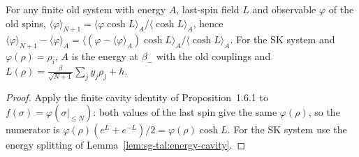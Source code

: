 \begin{lemma}
\label{lem:sg-tal:old-spin-cavity}
  \leanok
{}
For any finite old system with energy $A$, last-spin field $L$ and observable $\varphi$ of the old spins, $\langle\varphi\rangle_{N+1}=\langle\varphi\cosh L\rangle_A/\langle\cosh L\rangle_A$, hence $\langle\varphi\rangle_{N+1}-\langle\varphi\rangle_A=\langle(\varphi-\langle\varphi\rangle_A)\cosh L\rangle_A/\langle\cosh L\rangle_A$.  For the SK system and $\varphi(\rho)=\rho_i$, $A$ is the energy at $\beta_-$ with the old couplings and $L(\rho)=\frac\beta{\sqrt{N+1}}\sum_jy_j\rho_j+h$.
\end{lemma}
\begin{proof}
  \leanok
Apply the finite cavity identity of Proposition~1.6.1 to $f(\sigma)=\varphi(\sigma|_{\le N})$: both values of the last spin give the same $\varphi(\rho)$, so the numerator is $\varphi(\rho)(e^L+e^{-L})/2=\varphi(\rho)\cosh L$.  For the SK system use the energy splitting of Lemma~\ref{lem:sg-tal:energy-cavity}.
\end{proof}

